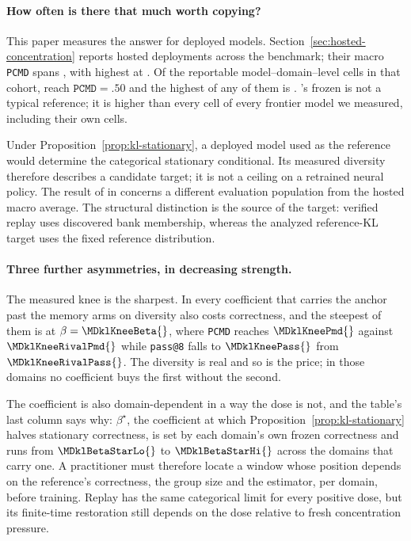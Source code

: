\documentclass{article}
\newcommand{\1}{\mathbf 1}
\newcommand{\pmd}{\texttt{PCMD}}
\theoremstyle{remark}
\theoremstyle{definition}
\theoremstyle{plain}
\begin{document}
\paragraph{How often is there that much worth copying?}
This paper measures the answer for deployed models.
Section~\ref{sec:hosted-concentration} reports \MDklHostedModels{} hosted
deployments across the benchmark; their macro \pmd{} spans
\MDklHostedRange{}, with \MDklHostedHiModel{} highest at \MDklHostedHi{}. Of
the \MDklHostedCells{} reportable model--domain--level cells in that cohort,
\MDklHostedCellsHalf{} reach $\pmd{}=.50$ and the highest of any of them is
\MDklHostedCellMax{}. \MDklTopFrozenDomain{}'s frozen \MDklTopFrozenPmd{} is
not a typical reference; it is higher than every cell of every frontier model
we measured, including their own \MDklTopFrozenDomain{} cells.

Under Proposition~\ref{prop:kl-stationary}, a deployed model used as the
reference would determine the categorical stationary conditional. Its
measured diversity therefore describes a candidate target; it is not a
ceiling on a retrained neural policy. The
\MDklTopMemoryArm{} result of \MDklTopMemoryPmd{} in
\MDklTopMemoryDomain{} concerns a different evaluation population from
the hosted macro average. The structural distinction is the source of the
target: verified replay uses discovered bank membership, whereas the
analyzed reference-KL target uses the fixed reference distribution.

\paragraph{Three further asymmetries, in decreasing strength.}
The measured knee is the sharpest. In \MDklPricedNames{} every coefficient
that carries the anchor past the memory arms on diversity also costs correctness,
and the steepest of them is \MDklKneeDomain{} at $\beta=\MDklKneeBeta{}$, where
\pmd{} reaches $\MDklKneePmd{}$ against $\MDklKneeRivalPmd{}$ while
\texttt{pass@8} falls to $\MDklKneePass{}$ from $\MDklKneeRivalPass{}$. The
diversity is real and so is the price; in those domains no coefficient buys the
first without the second.

The coefficient is also domain-dependent in a way the dose is not, and the
table's last column says why: $\beta^\star$, the coefficient at which
Proposition~\ref{prop:kl-stationary} halves stationary correctness, is set by
each domain's own frozen correctness and runs from $\MDklBetaStarLo{}$ to
$\MDklBetaStarHi{}$ across the domains that carry one. A practitioner must therefore locate a window whose position
depends on the reference's correctness, the group size and the estimator, per
domain, before training. Replay has the same categorical limit for every positive dose, but its
finite-time restoration still depends on the dose relative to fresh
concentration pressure.
\end{document}
